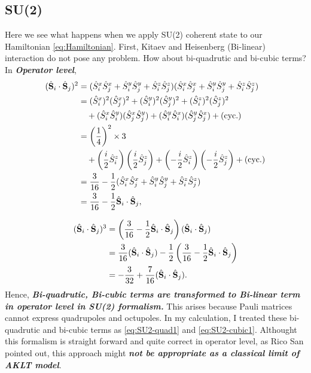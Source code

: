 \documentclass[11pt, aps, longbibliography]{article}
\begin{document}
\subsection{SU(2)}\label{sec:SU2}
Here we see what happens when we apply SU(2) coherent state to our Hamiltonian \eqref{eq:Hamiltonian}.
First, Kitaev and Heisenberg (Bi-linear) interaction do not pose any problem. 
How about bi-quadrutic and bi-cubic terms? In \textbf{\emph{Operator level}},
\begin{align}
    (\hat{\bold{S}}_i \cdot \hat{\bold{S}}_j)^2 &= (\hat{S}_i^x\hat{S}_j^x + \hat{S}_i^y\hat{S}_j^y + \hat{S}_i^z\hat{S}_j^z) (\hat{S}_i^x\hat{S}_j^x + \hat{S}_i^y\hat{S}_j^y + \hat{S}_i^z\hat{S}_j^z) \\
    &= (\hat{S}_i^x)^2 (\hat{S}_j^x)^2 + (\hat{S}_i^y)^2 (\hat{S}_j^y)^2 + (\hat{S}_i^z)^2 (\hat{S}_j^z)^2 \\
    & \quad + (\hat{S}_i^x \hat{S}_i^y) (\hat{S}_j^x \hat{S}_j^y) + (\hat{S}_i^y \hat{S}_i^x) (\hat{S}_j^y \hat{S}_j^x) + (\text{cyc.}) \\
    &= \left( \frac{1}{4} \right)^2 \times 3 \\
    & \quad +\left(\frac{i}{2}\hat{S}_i^z\right)\left(\frac{i}{2}\hat{S}_j^z\right) + \left(-\frac{i}{2}\hat{S}_i^z\right)\left(-\frac{i}{2}\hat{S}_j^z\right) + (\text{cyc.}) \\
    &= \frac{3}{16} - \frac{1}{2}(\hat{S}_i^x\hat{S}_j^x + \hat{S}_i^y\hat{S}_j^y + \hat{S}_i^z\hat{S}_j^z) \\
    &= \frac{3}{16} - \frac{1}{2}\hat{\bold{S}}_i \cdot \hat{\bold{S}}_j, \label{eq:SU2-quad1}
\end{align}

\begin{align}
    (\hat{\bold{S}}_i \cdot \hat{\bold{S}}_j)^3  &= \left(\frac{3}{16} - \frac{1}{2}\hat{\bold{S}}_i \cdot \hat{\bold{S}}_j \right) (\hat{\bold{S}}_i \cdot \hat{\bold{S}}_j ) \\
    &= \frac{3}{16}(\hat{\bold{S}}_i \cdot \hat{\bold{S}}_j ) - \frac{1}{2} \left( \frac{3}{16} - \frac{1}{2}\hat{\bold{S}}_i \cdot \hat{\bold{S}}_j \right) \\
    &= -\frac{3}{32} + \frac{7}{16} (\hat{\bold{S}}_i \cdot \hat{\bold{S}}_j). \label{eq:SU2-cubic1}
\end{align}
Hence, \textbf{\emph{Bi-quadrutic, Bi-cubic terms are transformed to Bi-linear term in operator level in SU(2) formalism.}}
This arises because Pauli matrices cannot express quadrupoles and octupoles.
In my calculation, I treated these bi-quadrutic and bi-cubic terms as \eqref{eq:SU2-quad1} and \eqref{eq:SU2-cubic1}.
Althought this formalism is straight forward and quite correct in operator level, as Rico San pointed out, this approach might \textbf{\emph{not be appropriate as a classical limit of AKLT model}}. 
\end{document}
